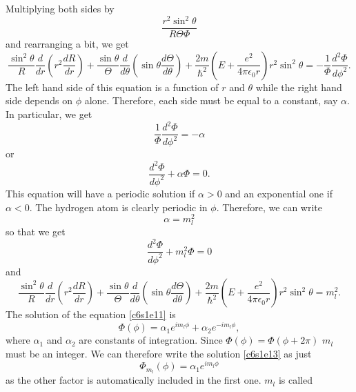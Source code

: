 Multiplying both sides by
\[
\frac{r^2\sin^2\theta}{R\Theta\Phi}
\]
and rearranging a bit, we get
\begin{equation}\label{c6s1e7}
\frac{\sin^2\theta}{R}\frac{d}{dr}\left(r^2\frac{dR}{dr}\right) +
\frac{\sin\theta}{\Theta}\frac{d}{d\theta}
\left(\sin\theta\frac{d\Theta}{d\theta}\right) +
\frac{2m}{\hslash^2}\left(E + \frac{e^2}{4\pi\epsilon_0 r}\right)
r^2\sin^2\theta =
-\frac{1}{\Phi}\frac{d^2\Phi}{d\phi^2}. 
\end{equation}
The left hand side of this equation is a function of $r$ and $\theta$ while
the right hand side depends on $\phi$ alone. Therefore, each side must be equal
to a constant, say $\alpha$. In particular, we get
\begin{equation}\label{c6s1e8}
\frac{1}{\Phi}\frac{d^2\Phi}{d\phi^2} = -\alpha
\end{equation}
or
\begin{equation}\label{c6s1e9}
\frac{d^2\Phi}{d\phi^2} + \alpha\Phi = 0.
\end{equation}
This equation will have a periodic solution if $\alpha > 0$ and an exponential
one if $\alpha < 0$. The hydrogen atom is clearly periodic in $\phi$. Therefore,
we can write
\begin{equation}\label{c6s1e10}
\alpha = m_l^2
\end{equation} 
so that we get
\begin{equation}\label{c6s1e11}
\frac{d^2\Phi}{d\phi^2} + m_l^2\Phi = 0
\end{equation}
and
\begin{equation}\label{c6s1e12}
\frac{\sin^2\theta}{R}\frac{d}{dr}\left(r^2\frac{dR}{dr}\right) +
\frac{\sin\theta}{\Theta}\frac{d}{d\theta}
\left(\sin\theta\frac{d\Theta}{d\theta}\right) +
\frac{2m}{\hslash^2}\left(E + \frac{e^2}{4\pi\epsilon_0r}\right)
r^2\sin^2\theta = m_l^2.
\end{equation}
The solution of the equation \eqref{c6s1e11} is
\begin{equation}\label{c6s1e13}
\Phi(\phi) = \alpha_1 e^{im_l\phi} + \alpha_2 e^{-im_l\phi},
\end{equation}
where $\alpha_1$ and $\alpha_2$ are constants of integration. Since $\Phi(\phi)
= \Phi(\phi + 2\pi)$ $m_l$ must be an integer. We can therefore write the 
solution \eqref{c6s1e13} as just
\begin{equation}\label{c6s1e14}
\Phi_{m_l}(\phi) = \alpha_1 e^{im_l\phi}
\end{equation}
as the other factor is automatically included in the first one. $m_l$ is called
